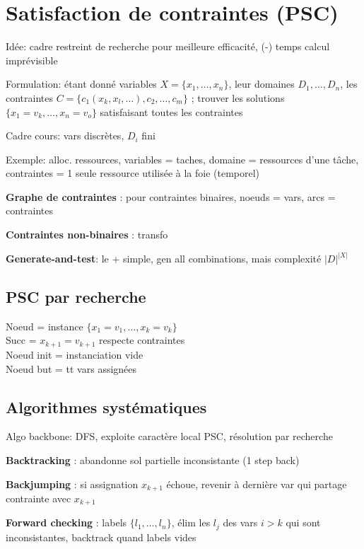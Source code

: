 \section*{Satisfaction de contraintes (PSC)}

Idée: cadre restreint de recherche pour meilleure efficacité, (-) temps calcul imprévisible

Formulation: étant donné variables $X = \{x_1, \dots, x_n\}$, leur domaines $D_1, \dots, D_n$, les contraintes $C = \{c_1(x_k, x_l, \dots), c_2, \dots, c_m\}$ ; trouver les solutions $\{x_1=v_k, \dots, x_n = v_o\}$ satisfaisant toutes les contraintes

Cadre cours: vars discrètes, $D_i$ fini

Exemple: alloc. ressources, variables = taches, domaine = ressources d'une tâche, contraintes = 1 seule ressource utilisée à la foie (temporel)

\textbf{Graphe de contraintes} : pour contraintes binaires, noeuds = vars, arcs = contraintes

\textbf{Contraintes non-binaires} : transfo

\textbf{Generate-and-test}: le + simple, gen all combinations, mais complexité $|D|^{|X|}$


\subsection*{PSC par recherche}

Noeud = instance $\{x_1 = v_1, \dots, x_k = v_k\}$ \\
Succ = $x_{k+1}=v_{k+1}$ respecte contraintes \\
Noeud init = instanciation vide \\
Noeud but = tt vars assignées


\subsection*{Algorithmes systématiques}

Algo backbone: DFS, exploite caractère local PSC, résolution par recherche

\textbf{Backtracking} : abandonne sol partielle inconsistante (1 step back)

\textbf{Backjumping} : si assignation $x_{k+1}$ échoue, revenir à dernière var qui partage contrainte avec $x_{k+1}$

\textbf{Forward checking} : labels $\{l_1,\dots,l_n\}$, élim les $l_j$ des vars $i>k$ qui sont inconsistantes, backtrack quand labels vides

